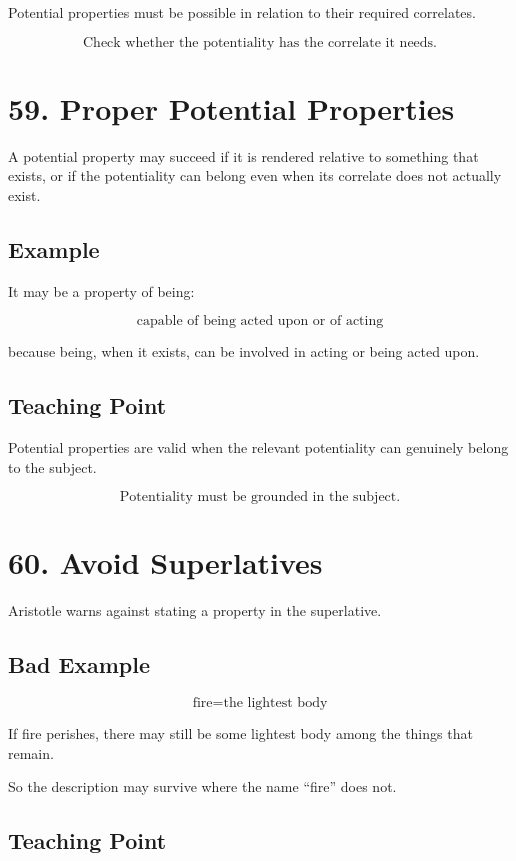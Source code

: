 \documentclass[12pt]{article}
\begin{document}
Potential properties must be possible in relation to their required correlates.

\[
\boxed{
\text{Check whether the potentiality has the correlate it needs.}
}
\]

\section*{59. Proper Potential Properties}

A potential property may succeed if it is rendered relative to something that
exists, or if the potentiality can belong even when its correlate does not
actually exist.

\subsection*{Example}

It may be a property of being:

\[
\text{capable of being acted upon or of acting}
\]

because being, when it exists, can be involved in acting or being acted upon.

\subsection*{Teaching Point}

Potential properties are valid when the relevant potentiality can genuinely
belong to the subject.

\[
\boxed{
\text{Potentiality must be grounded in the subject.}
}
\]

\section*{60. Avoid Superlatives}

Aristotle warns against stating a property in the superlative.

\subsection*{Bad Example}

\[
\text{fire} = \text{the lightest body}
\]

If fire perishes, there may still be some lightest body among the things that
remain.

So the description may survive where the name ``fire'' does not.

\subsection*{Teaching Point}
\end{document}
